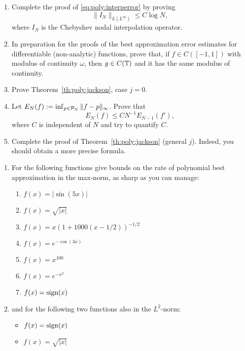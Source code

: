 \begin{exercise}
   \label{exr:poly:convergence}
   \begin{enumerate} \ilist
   \item Complete the proof of \eqref{eq:poly:interperror} by proving
      \[
         \| I_N \|_{L(L^\infty)} \leq C \log N,
      \]
      where $I_N$ is the Chebyshev nodal interpolation operator.

   \item In preparation for the proofs of the best approximation error estimates
      for differentiable (non-analytic) functions, prove that, if $f \in
      C([-1,1])$ with modulus of continuity $\omega$, then $g \in C(\mathbb{T})$ and it
      has the same modulus of continuity.

   \item Prove Theorem~\ref{th:poly:jackson}, case $j = 0$.

   \item Let $E_N(f) := \inf_{p \in \mathcal{P}_N} \|f - p\|_\infty$. Prove that 
      \[
         E_N(f)  \leq C N^{-1} E_{N-1}(f'),
      \]
      where $C$ is independent of $N$ and try to quantify $C$.

   \item Complete the proof of Theorem~\ref{th:poly:jackson} (general $j$).
   Indeed, you should obtain a more precise formula.
   \end{enumerate}
\end{exercise}

\begin{exercise} 
   \label{exr:poly:examplefunctions}
   \begin{enumerate} \ilist 
   \item For the following functions give bounds on the rate of polynomial best
   approximation in the max-norm, as sharp as you can manage: 
   \begin{enumerate} \ilist
      \item $f(x) = |\sin(5 x)|$ 
      \item $f(x) = \sqrt{|x|}$
      \item $f(x) = x (1 + 1000 (x - 1/2))^{-1/2}$
      \item $f(x) = e^{- \cos(3x)}$
      \item $f(x) = x^{100}$
      \item $f(x) = e^{-x^2}$ 
      \item $f(x) = {\rm sign}(x)$
   \end{enumerate}
   \item and for the following two functions also in the $L^2$-norm:
   \begin{itemize}
      \item $f(x) = {\rm sign}(x)$
      \item $f(x) = \sqrt{|x|}$
   \end{itemize}
   \end{enumerate}
\end{exercise}

